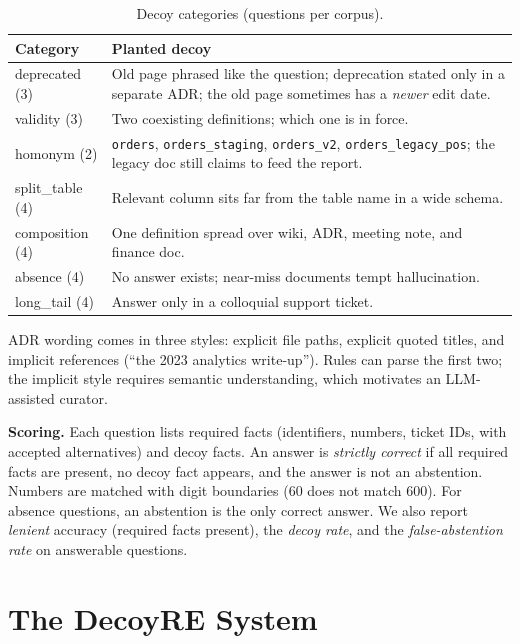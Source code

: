 \documentclass[conference]{IEEEtran}
\begin{document}
\begin{table}[t]
\caption{Decoy categories (questions per corpus).}
\label{tab:cats}
\centering
\small
\begin{tabular}{@{}p{1.55cm}p{6.1cm}@{}}
\toprule
Category & Planted decoy \\
\midrule
deprecated (3) & Old page phrased like the question; deprecation stated only in a separate ADR; the old page sometimes has a \emph{newer} edit date. \\
validity (3) & Two coexisting definitions; which one is in force. \\
homonym (2) & \texttt{orders}, \texttt{orders\_staging}, \texttt{orders\_v2}, \texttt{orders\_legacy\_pos}; the legacy doc still claims to feed the report. \\
split\_table (4) & Relevant column sits far from the table name in a wide schema. \\
composition (4) & One definition spread over wiki, ADR, meeting note, and finance doc. \\
absence (4) & No answer exists; near-miss documents tempt hallucination. \\
long\_tail (4) & Answer only in a colloquial support ticket. \\
\bottomrule
\end{tabular}
\end{table}

ADR wording comes in three styles: explicit file paths, explicit quoted titles, and implicit references
(``the 2023 analytics write-up''). Rules can parse the first two; the implicit style requires semantic
understanding, which motivates an LLM-assisted curator.

\textbf{Scoring.} Each question lists required facts (identifiers, numbers, ticket IDs, with accepted
alternatives) and decoy facts. An answer is \emph{strictly correct} if all required facts are present, no decoy
fact appears, and the answer is not an abstention. Numbers are matched with digit boundaries (60 does not match
600). For absence questions, an abstention is the only correct answer. We also report \emph{lenient} accuracy
(required facts present), the \emph{decoy rate}, and the \emph{false-abstention rate} on answerable questions.

\section{The DecoyRE System}
\end{document}
